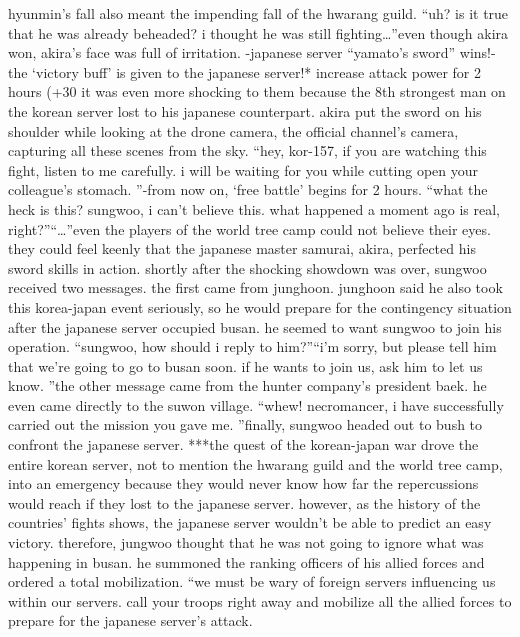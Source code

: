 hyunmin’s fall also meant the impending fall of the hwarang guild.
“uh? is it true that he was already beheaded? i thought he was still fighting…”even though akira won, akira’s face was full of irritation.
-japanese server “yamato’s sword” wins!-the ‘victory buff’ is given to the japanese server!* increase attack power for 2 hours (+30%
 it was even more shocking to them because the 8th strongest man on the korean server lost to his japanese counterpart.
akira put the sword on his shoulder while looking at the drone camera, the official channel’s camera, capturing all these scenes from the sky.
“hey, kor-157, if you are watching this fight, listen to me carefully.
 i will be waiting for you while cutting open your colleague’s stomach.
”-from now on, ‘free battle’ begins for 2 hours.
“what the heck is this? sungwoo, i can’t believe this.
 what happened a moment ago is real, right?”“…”even the players of the world tree camp could not believe their eyes.
 they could feel keenly that the japanese master samurai, akira, perfected his sword skills in action.
shortly after the shocking showdown was over, sungwoo received two messages.
 the first came from junghoon.
 junghoon said he also took this korea-japan event seriously, so he would prepare for the contingency situation after the japanese server occupied busan.
 he seemed to want sungwoo to join his operation.
“sungwoo, how should i reply to him?”“i’m sorry, but please tell him that we’re going to go to busan soon.
 if he wants to join us, ask him to let us know.
”the other message came from the hunter company’s president baek.
 he even came directly to the suwon village.
“whew! necromancer, i have successfully carried out the mission you gave me.
”finally, sungwoo headed out to bush to confront the japanese server.
***the quest of the korean-japan war drove the entire korean server, not to mention the hwarang guild and the world tree camp, into an emergency because they would never know how far the repercussions would reach if they lost to the japanese server.
however, as the history of the countries’ fights shows, the japanese server wouldn’t be able to predict an easy victory.
therefore, jungwoo thought that he was not going to ignore what was happening in busan.
 he summoned the ranking officers of his allied forces and ordered a total mobilization.
“we must be wary of foreign servers influencing us within our servers.
 call your troops right away and mobilize all the allied forces to prepare for the japanese server’s attack.
